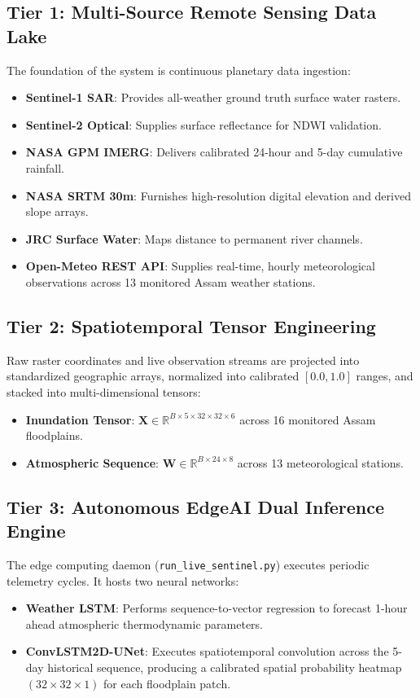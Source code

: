 \documentclass[12pt,a4paper,oneside]{report}
\begin{document}
\subsection{Tier 1: Multi-Source Remote Sensing Data Lake}
The foundation of the system is continuous planetary data ingestion:
\begin{itemize}
    \item \textbf{Sentinel-1 SAR}: Provides all-weather ground truth surface water rasters.
    \item \textbf{Sentinel-2 Optical}: Supplies surface reflectance for NDWI validation.
    \item \textbf{NASA GPM IMERG}: Delivers calibrated 24-hour and 5-day cumulative rainfall.
    \item \textbf{NASA SRTM 30m}: Furnishes high-resolution digital elevation and derived slope arrays.
    \item \textbf{JRC Surface Water}: Maps distance to permanent river channels.
    \item \textbf{Open-Meteo REST API}: Supplies real-time, hourly meteorological observations across 13 monitored Assam weather stations.
\end{itemize}

\subsection{Tier 2: Spatiotemporal Tensor Engineering}
Raw raster coordinates and live observation streams are projected into standardized geographic arrays, normalized into calibrated $[0.0, 1.0]$ ranges, and stacked into multi-dimensional tensors:
\begin{itemize}
    \item \textbf{Inundation Tensor}: $\mathbf{X} \in \mathbb{R}^{B \times 5 \times 32 \times 32 \times 6}$ across 16 monitored Assam floodplains.
    \item \textbf{Atmospheric Sequence}: $\mathbf{W} \in \mathbb{R}^{B \times 24 \times 8}$ across 13 meteorological stations.
\end{itemize}

\subsection{Tier 3: Autonomous EdgeAI Dual Inference Engine}
The edge computing daemon (\texttt{run\_live\_sentinel.py}) executes periodic telemetry cycles. It hosts two neural networks:
\begin{itemize}
    \item \textbf{Weather LSTM}: Performs sequence-to-vector regression to forecast 1-hour ahead atmospheric thermodynamic parameters.
    \item \textbf{ConvLSTM2D-UNet}: Executes spatiotemporal convolution across the 5-day historical sequence, producing a calibrated spatial probability heatmap $(32 \times 32 \times 1)$ for each floodplain patch.
\end{itemize}
\end{document}
